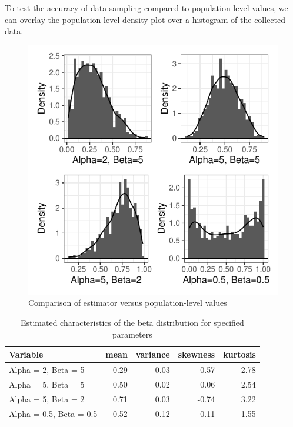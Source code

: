 \documentclass{article}\usepackage[]{graphicx}\usepackage[]{xcolor}
\begin{document}
\begin{multicols}{2}
To test the accuracy of data sampling compared to population-level values, we can overlay the population-level density plot over a histogram of the collected data.

\begin{figure}[H]
 \begin{center}
 \includegraphics[scale=0.8]{density_histogram.pdf}
 \caption{Comparison of estimator versus population-level values}
 \label{fig2}
 \end{center}
 \end{figure}





\begin{table}[H]
\centering
\begingroup\small
\begin{tabular}{lrrrr}
  \hline
Variable & mean & variance & skewness & kurtosis \\ 
  \hline
Alpha = 2, Beta = 5 & 0.29 & 0.03 & 0.57 & 2.78 \\ 
  Alpha = 5, Beta = 5 & 0.50 & 0.02 & 0.06 & 2.54 \\ 
  Alpha = 5, Beta = 2 & 0.71 & 0.03 & -0.74 & 3.22 \\ 
  Alpha = 0.5, Beta = 0.5 & 0.52 & 0.12 & -0.11 & 1.55 \\ 
   \hline
\end{tabular}
\endgroup
\caption{Estimated characteristics of the beta distribution for specified parameters} 
\label{estim.tab}
\end{table}




\end{multicols}
\end{document}
